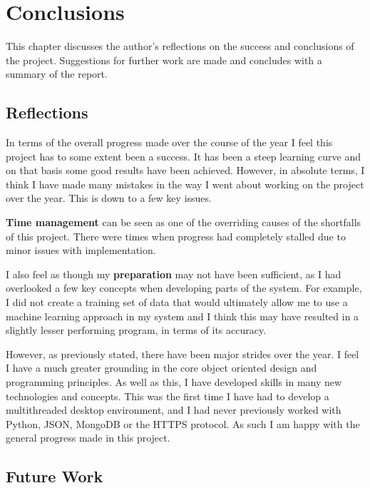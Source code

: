 \chapter{Conclusions}
\label{cha:conclusion}
This chapter discusses the author's reflections on the success and conclusions of the project. Suggestions for further work are made and concludes with a summary of the report. 

\section{Reflections}
In terms of the overall progress made over the course of the year I feel this project has to some extent been a success. It has been a steep learning curve and on that basis some good results have been achieved. However, in absolute terms, I think I have made many mistakes in the way I went about working on the project over the year. This is down to a few key issues.

\textbf{Time management} can be seen as one of the overriding causes of the shortfalls of this project. There were times when progress had completely stalled due to minor issues with implementation.


I also feel as though my \textbf{preparation} may not have been sufficient, as I had overlooked a few key concepts when developing parts of the system. For example, I did not create a training set of data that would ultimately allow me to use a machine learning approach in my system and I think this may have resulted in a slightly lesser performing program, in terms of its accuracy.



However, as previously stated, there have been major strides over the year. I feel I have a much greater grounding in the core object oriented design and programming principles. As well as this, I have developed skills in many new technologies and concepts. This was the first time I have had to develop a multithreaded desktop environment, and I had never previously worked with Python, JSON, MongoDB or the HTTPS protocol. As such I am happy with the general progress made in this project.

\section{Future Work}
